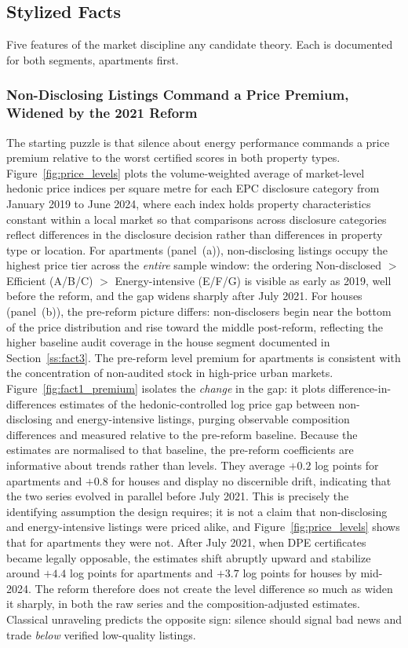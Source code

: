 \subsection{Stylized Facts}
\label{sec:facts}

Five features of the market discipline any candidate theory. Each is documented for both segments,
apartments first.

\subsubsection{Non-Disclosing Listings Command a Price Premium, Widened by the 2021 Reform}
\label{ss:fact1}

The starting puzzle is that silence about energy performance commands a price premium relative to the worst certified scores in both property types. Figure~\ref{fig:price_levels} plots the volume-weighted average of market-level hedonic price indices per square metre for each EPC disclosure category from January 2019 to June 2024, where each index holds property characteristics constant within a local market so that comparisons across disclosure categories reflect differences in the disclosure decision rather than differences in property type or location. For apartments (panel~(a)), non-disclosing listings occupy the highest price tier across the \emph{entire} sample window: the ordering Non-disclosed $>$ Efficient (A/B/C) $>$ Energy-intensive (E/F/G) is visible as early as 2019, well before the reform, and the gap widens sharply after July 2021. For houses (panel~(b)), the pre-reform picture differs: non-disclosers begin near the bottom of the price distribution and rise toward the middle post-reform, reflecting the higher baseline audit coverage in the house segment documented in Section~\ref{ss:fact3}. The pre-reform level premium for apartments is consistent with the concentration of non-audited stock in high-price urban markets. Figure~\ref{fig:fact1_premium} isolates the \emph{change} in the gap: it plots difference-in-differences estimates of the hedonic-controlled log price gap between non-disclosing and energy-intensive listings, purging observable composition differences and measured relative to the pre-reform baseline. Because the estimates are normalised to that baseline, the pre-reform coefficients are informative about trends rather than levels. They average $+0.2$ log points for apartments and $+0.8$ for houses and display no discernible drift, indicating that the two series evolved in parallel before July 2021. This is precisely the identifying assumption the design requires; it is not a claim that non-disclosing and energy-intensive listings were priced alike, and Figure~\ref{fig:price_levels} shows that for apartments they were not. After July 2021, when DPE certificates became legally opposable, the estimates shift abruptly upward and stabilize around $+4.4$ log points for apartments and $+3.7$ log points for houses by mid-2024. The reform therefore does not create the level difference so much as widen it sharply, in both the raw series and the composition-adjusted estimates. Classical unraveling predicts the opposite sign: silence should signal bad news and trade \emph{below} verified low-quality listings.

